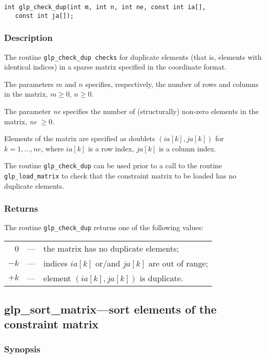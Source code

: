 \begin{verbatim}
int glp_check_dup(int m, int n, int ne, const int ia[],
   const int ja[]);
\end{verbatim}

\subsubsection*{Description}

The routine \verb|glp_check_dup checks| for duplicate elements (that
is, elements with identical indices) in a sparse matrix specified in
the coordinate format.

The parameters $m$ and $n$ specifies, respectively, the number of rows
and columns in the matrix, $m\geq 0$, $n\geq 0$.

The parameter {\it ne} specifies the number of (structurally) non-zero
elements in the matrix, {\it ne} $\geq 0$.

Elements of the matrix are specified as doublets $(ia[k],ja[k])$ for
$k=1,\dots,ne$, where $ia[k]$ is a row index, $ja[k]$ is a column index.

The routine \verb|glp_check_dup| can be used prior to a call to the
routine \verb|glp_load_matrix| to check that the constraint matrix to
be loaded has no duplicate elements.

\subsubsection*{Returns}

The routine \verb|glp_check_dup| returns one of the following values:

\noindent
\begin{tabular}{@{}r@{\ }c@{\ }l@{}}
0&---&the matrix has no duplicate elements;\\
$-k$&---&indices $ia[k]$ or/and $ja[k]$ are out of range;\\
$+k$&---&element $(ia[k],ja[k])$ is duplicate.\\
\end{tabular}

\subsection{glp\_sort\_matrix---sort elements of the constraint matrix}

\subsubsection*{Synopsis}

